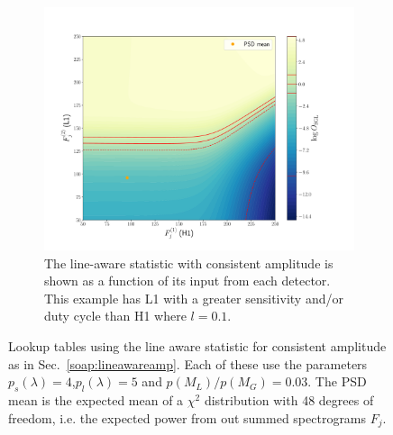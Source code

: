 \begin{figure}
\begin{subfigure}[h]{\linewidth}
\begin{minipage}{0.65\linewidth}
\includegraphics[width=0.9\columnwidth]{C3_soap/lookup_3d_0.pdf}
\end{minipage}\hfill
\begin{minipage}{0.35\linewidth}
\caption{The line-aware statistic with consistent amplitude is shown as a function of its input from each detector. This example has L1 with a greater sensitivity and/or duty cycle than H1 where $l=0.1$.}
\label{soap:lineawareamp:plot:linebig}
\end{minipage}
\end{subfigure}
\caption[Lookup tables for line aware statistic with consistent amplitude.]{Lookup tables using the line aware statistic for consistent amplitude as in Sec.~\ref{soap:lineawareamp}. Each of these use the parameters $p_s(\lambda) = 4$,$p_l(\lambda) = 5$ and $p(M_L)/p(M_G) = 0.03$. The \gls{PSD} mean is the expected mean of a $\chi^2$ distribution with 48 degrees of freedom, i.e. the expected power from out summed spectrograms $F_j$. }
\label{soap:lineawareamp:example}
\end{figure}


